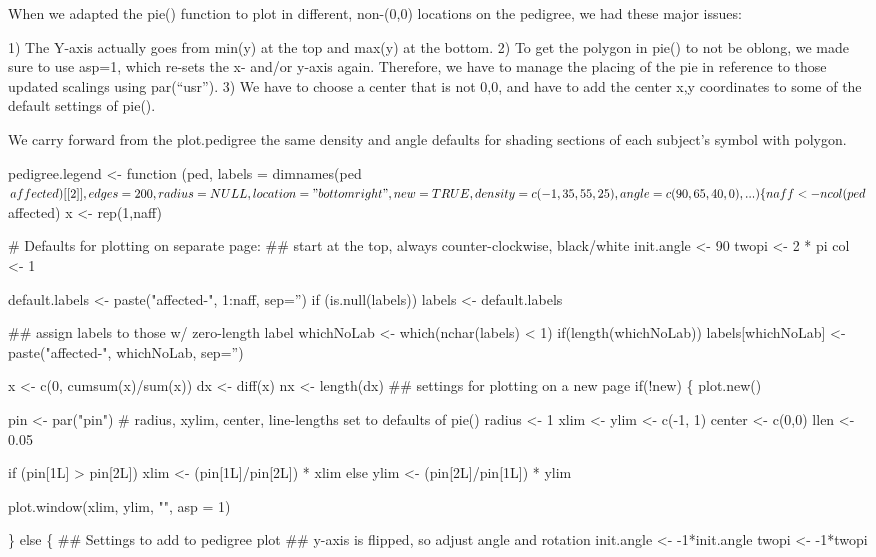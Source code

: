 \documentclass{article}
\begin{document}
When we adapted the pie() function to plot in different, non-(0,0) locations
on the pedigree, we had these major issues:

1) The Y-axis actually goes from min(y) at the top and max(y) at the bottom.
2) To get the polygon in pie() to not be oblong, we made sure to use asp=1, 
which re-sets the x- and/or y-axis again.  Therefore, we have to manage the 
placing of the pie in reference to those updated scalings using par(``usr'').
3) We have to choose a center that is not 0,0, and have to add the center
x,y coordinates to some of the default settings of pie().

We carry forward from the plot.pedigree the same density and angle defaults
for shading sections of each subject's symbol with polygon.  


\nwenddocs{}\endmoddef

pedigree.legend <- function (ped, labels = dimnames(ped$affected)[[2]],
    edges = 200, radius=NULL, location="bottomright", new=TRUE,
    density = c(-1, 35, 55, 25),  angle = c(90, 65, 40, 0), ...) 
\{
   
    naff <- ncol(ped$affected)
    x <- rep(1,naff)
    
    # Defaults for plotting on separate page:
    ## start at the top, always counter-clockwise, black/white
    init.angle <- 90
    twopi <- 2 * pi
    col <- 1

    default.labels <- paste("affected-", 1:naff, sep='')
    if (is.null(labels)) labels <- default.labels
    
    ## assign labels to those w/ zero-length label
    whichNoLab <- which(nchar(labels) < 1)
    if(length(whichNoLab))
      labels[whichNoLab] <- paste("affected-", whichNoLab, sep='')

    
    x <- c(0, cumsum(x)/sum(x))
    dx <- diff(x)
    nx <- length(dx)
    ## settings for plotting on a new page
    if(!new) \{
      plot.new()
      
      pin <- par("pin")
      # radius, xylim, center, line-lengths set to defaults of pie()
      radius <- 1
      xlim <- ylim <- c(-1, 1)
      center <- c(0,0)
      llen <- 0.05
      
      if (pin[1L] > pin[2L]) 
        xlim <- (pin[1L]/pin[2L]) * xlim
      else ylim <- (pin[2L]/pin[1L]) * ylim
      
      plot.window(xlim, ylim, "", asp = 1)
      
    \} else \{
      ## Settings to add to pedigree plot
      ## y-axis is flipped, so adjust angle and rotation
      init.angle <- -1*init.angle
      twopi <- -1*twopi
\end{document}
